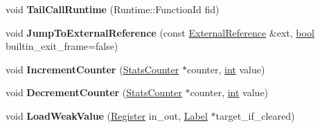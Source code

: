 \begin{DoxyCompactItemize}
void {\bfseries Tail\+Call\+Runtime} (Runtime\+::\+Function\+Id fid)
\item 
\mbox{\label{classv8_1_1internal_1_1MacroAssembler_ad7a8f5a73afff9391fa981d05edf8d0d}} 
void {\bfseries Jump\+To\+External\+Reference} (const \mbox{\hyperlink{classv8_1_1internal_1_1ExternalReference}{External\+Reference}} \&ext, \mbox{\hyperlink{classbool}{bool}} builtin\+\_\+exit\+\_\+frame=false)
\item 
\mbox{\label{classv8_1_1internal_1_1MacroAssembler_a09f54011a95bf61d612dbf3ffa771764}} 
void {\bfseries Increment\+Counter} (\mbox{\hyperlink{classv8_1_1internal_1_1StatsCounter}{Stats\+Counter}} $\ast$counter, \mbox{\hyperlink{classint}{int}} value)
\item 
\mbox{\label{classv8_1_1internal_1_1MacroAssembler_ab8024b0c2f74025fe77837c708ffd934}} 
void {\bfseries Decrement\+Counter} (\mbox{\hyperlink{classv8_1_1internal_1_1StatsCounter}{Stats\+Counter}} $\ast$counter, \mbox{\hyperlink{classint}{int}} value)
\item 
\mbox{\label{classv8_1_1internal_1_1MacroAssembler_a53a974c36de33ea90f1f1f0b69c5d465}} 
void {\bfseries Load\+Weak\+Value} (\mbox{\hyperlink{classv8_1_1internal_1_1Register}{Register}} in\+\_\+out, \mbox{\hyperlink{classv8_1_1internal_1_1Label}{Label}} $\ast$target\+\_\+if\+\_\+cleared)
\end{DoxyCompactItemize}
